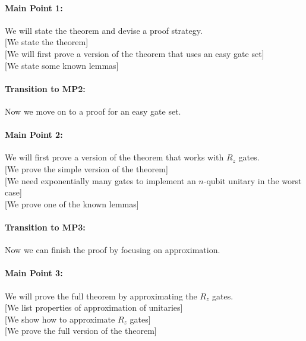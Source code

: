 \documentclass[11pt]{article}
\begin{document}
\paragraph{Main Point 1:}
We will state the theorem and devise a proof strategy. \\
\hspace*{1cm}
   [We state the theorem] \\ 
\hspace*{1cm}
   [We will first prove a version of the theorem that uses an easy gate set] \\
\hspace*{1cm}
   [We state some known lemmas]

\paragraph{Transition to MP2:}
Now we move on to a proof for an easy gate set.

\paragraph{Main Point 2:}
We will first prove a version of the theorem that works with $R_z$ gates. \\
\hspace*{1cm}
   [We prove the simple version of the theorem] \\
\hspace*{1cm}
   [We need exponentially many gates to implement an $n$-qubit unitary in the worst case] \\
\hspace*{1cm}
   [We prove one of the known lemmas] 

\paragraph{Transition to MP3:}
Now we can finish the proof by focusing on approximation.

\paragraph{Main Point 3:}
We will prove the full theorem by approximating the $R_z$ gates. \\
\hspace*{1cm}
   [We list properties of approximation of unitaries] \\
\hspace*{1cm}
   [We show how to approximate $R_z$ gates] \\
\hspace*{1cm}
   [We prove the full version of the theorem] 
\end{document}
